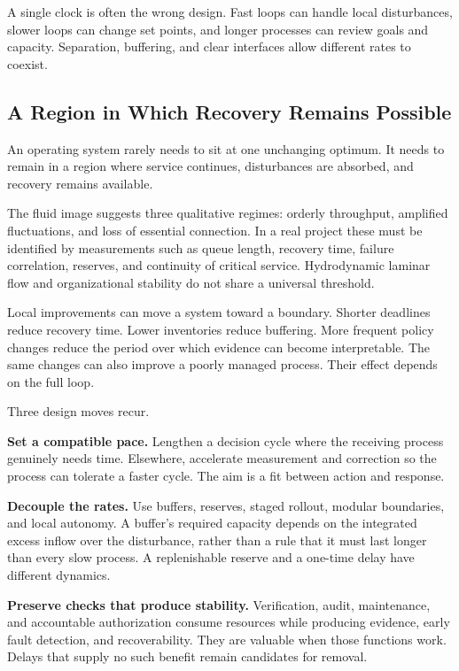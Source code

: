 \documentclass[11pt,openany]{book}
\begin{document}
A single clock is often the wrong design. Fast loops can handle local disturbances, slower loops can change set points, and longer processes can review goals and capacity. Separation, buffering, and clear interfaces allow different rates to coexist.

\subsection{A Region in Which Recovery Remains Possible}

An operating system rarely needs to sit at one unchanging optimum. It needs to remain in a region where service continues, disturbances are absorbed, and recovery remains available.

The fluid image suggests three qualitative regimes: orderly throughput, amplified fluctuations, and loss of essential connection. In a real project these must be identified by measurements such as queue length, recovery time, failure correlation, reserves, and continuity of critical service. Hydrodynamic laminar flow and organizational stability do not share a universal threshold.

Local improvements can move a system toward a boundary. Shorter deadlines reduce recovery time. Lower inventories reduce buffering. More frequent policy changes reduce the period over which evidence can become interpretable. The same changes can also improve a poorly managed process. Their effect depends on the full loop.

Three design moves recur.

\textbf{Set a compatible pace.} Lengthen a decision cycle where the receiving process genuinely needs time. Elsewhere, accelerate measurement and correction so the process can tolerate a faster cycle. The aim is a fit between action and response.

\textbf{Decouple the rates.} Use buffers, reserves, staged rollout, modular boundaries, and local autonomy. A buffer's required capacity depends on the integrated excess inflow over the disturbance, rather than a rule that it must last longer than every slow process. A replenishable reserve and a one-time delay have different dynamics.

\textbf{Preserve checks that produce stability.} Verification, audit, maintenance, and accountable authorization consume resources while producing evidence, early fault detection, and recoverability. They are valuable when those functions work. Delays that supply no such benefit remain candidates for removal.
\end{document}
